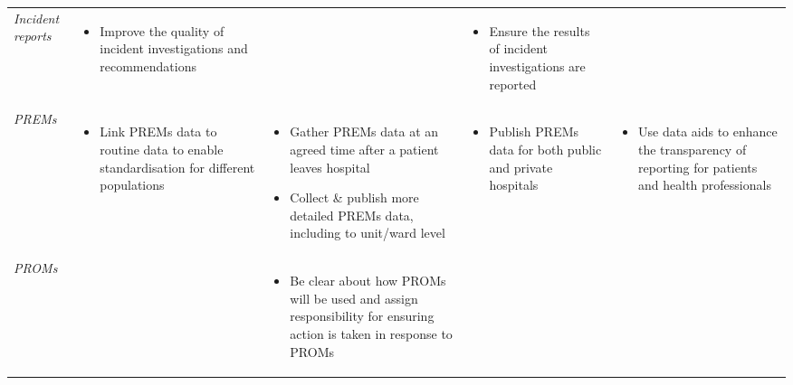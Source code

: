 \documentclass[FrontPage]{grattan}
\begin{document}
\begin{longtable}{@{}>{\itshape}p{1.2cm}p{5.4cm}p{5.6cm}p{5.35cm}p{5.4cm}}
        Incident reports & \vspace{-2.5ex}\begin{itemize}[noitemsep,topsep=0pt,leftmargin=*]
        \item Improve the quality of incident investigations and recommendations
    \end{itemize} & & \vspace{-2.5ex}\begin{itemize}[noitemsep,topsep=0pt,leftmargin=*]
        \item Ensure the results of incident investigations are reported
    \end{itemize} & \\ 
%        
    PREMs & \vspace{-2.5ex}\begin{itemize}[noitemsep,topsep=0pt,leftmargin=*]
        \item Link PREMs data to routine data to enable standardisation for different populations
    \end{itemize} & \vspace{-2.5ex}\begin{itemize}[noitemsep,topsep=0pt,leftmargin=*]
        \item Gather PREMs data at an agreed time after a patient leaves hospital
        \item Collect \& publish more detailed PREMs data, including to unit/ward level
    \end{itemize} & \vspace{-2.5ex}\begin{itemize}[noitemsep,topsep=0pt,leftmargin=*]
        \item Publish PREMs data for both public and private hospitals
    \end{itemize} & \vspace{-2.5ex}\begin{itemize}[noitemsep,topsep=0pt,leftmargin=*]
        \item Use data aids to enhance the transparency of reporting for patients and health professionals
    \end{itemize}\\ 
%        
    PROMs & & \vspace{-2.5ex}\begin{itemize}[noitemsep,topsep=0pt,leftmargin=*,after=\vspace{-1\baselineskip}]
        \item Be clear about how PROMs will be used and assign responsibility for ensuring action is taken in response to PROMs
    \end{itemize} &  & \\[-3\baselineskip]
    \bottomrule
\end{longtable}
\twocolumn
\end{document}

